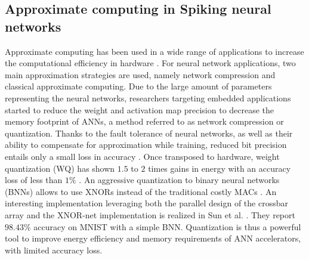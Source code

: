 \subsection{Approximate computing in Spiking neural networks}
Approximate computing has been used in a wide range of applications to increase the computational efficiency in hardware \cite{han2013approximate}. For neural network applications, two main approximation strategies are used, namely network compression and classical approximate computing.
Due to the large amount of parameters representing the neural networks, researchers targeting embedded applications started to reduce the weight and activation map precision to decrease the memory footprint of ANNs, a method referred to as network compression or quantization.
Thanks to the fault tolerance of neural networks, as well as their ability to compensate for approximation while training, reduced bit precision entails only a small loss in accuracy \cite{courbariaux2015binaryconnect, han2015deep, hubara2017quantized, rastegari2016xnor}.
Once transposed to hardware, weight quantization (WQ) has shown $1.5$ to $2$ times gains in energy
with an accuracy loss of less than $1\%$ \cite{moons20160, whatmough201714}. An aggressive quantization to binary neural networks (BNNs) allows to use XNORs instead of the traditional costly MACs \cite{rastegari2016xnor}. An interesting implementation leveraging both the parallel design of the crossbar array and the XNOR-net implementation is realized in Sun et al. \cite{sun2018xnor}. They report $98.43\%$ accuracy on MNIST with a simple BNN. Quantization is thus a powerful tool to improve energy efficiency and memory requirements of ANN accelerators, with limited accuracy loss.

